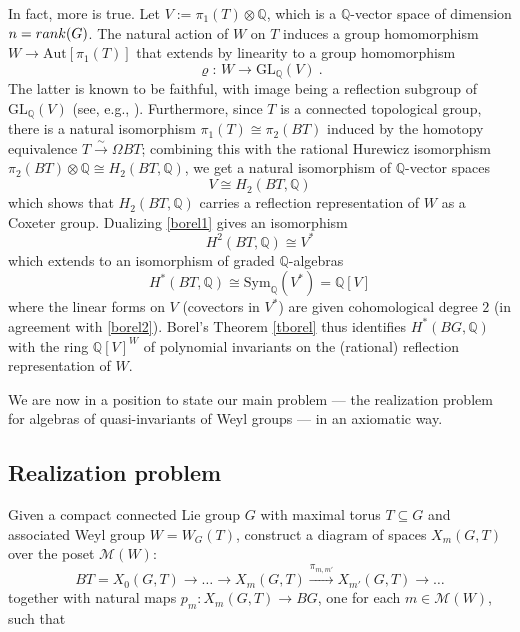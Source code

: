 \documentclass[11pt]{amsart}
\theoremstyle{definition}
\theoremstyle{remark}
\numberwithin{equation}{section}
\newcommand{\la}{\label}
\newcommand{\GL}{\mathrm{GL}}
\def\M{\mathcal{M}}
\def\Q{\mathbb{Q}}
\begin{document}
In fact, more is true. Let $ V := \pi_1(T) \otimes \Q $, which is a $\Q$-vector space of dimension $ n = {\rm rank}(G)$. The natural action of $W$ on $T$ induces a group homomorphism $W \to \mathrm{Aut}[\pi_1(T)]$ that extends by linearity to a group homomorphism
%
\begin{equation} \la{weylglq} \varrho:\, W \to \GL_{\Q}(V) \ .\end{equation}
%
The latter is known to be faithful, with image being a reflection subgroup of $\GL_{\Q}(V)$ (see, e.g., \cite[Theorem 5.16]{DW98}). 
Furthermore, since $T$ is a connected topological group, there is a natural isomorphism $\pi_1(T) \cong \pi_2(BT)$ induced by the homotopy equivalence $T \stackrel{\sim}{\to} \Omega B T$; combining this with the rational Hurewicz isomorphism  $\pi_2(BT) \otimes \Q \cong H_2(BT, \Q)$, we get a natural isomorphism of $\Q$-vector spaces 
%
\begin{equation} \la{borel1} V \cong H_2(BT , \Q)\end{equation}
%
which shows that $H_2(BT, \Q)$ carries a reflection representation of $W$ as a Coxeter group. Dualizing \eqref{borel1} gives an isomorphism 
%
\begin{equation} 
\la{borel2}
H^2(BT, \Q) \cong V^{\ast} 
\end{equation}
%
which extends to an isomorphism of graded $\Q$-algebras 
%
\begin{equation} 
\la{borel3} 
H^{\ast}(BT , \Q) \cong \mathrm{Sym}_{\Q}(V^{\ast}) = \Q[V] 
\end{equation}
%
where the linear forms on $V$ (covectors in $V^{\ast}$) are given cohomological degree $2$ (in agreement with \eqref{borel2}). Borel's Theorem \ref{tborel} thus identifies $H^{\ast}(BG , \Q)$ with the ring $\Q[V]^W$ of polynomial invariants on the (rational) reflection representation of $W$. 

We are now in a position to state our main problem --- the realization problem for algebras of quasi-invariants of Weyl groups --- in an axiomatic way.

\subsection{Realization problem} 
\la{realizationprob}
Given a compact connected Lie group $G$ with maximal torus $T \subseteq G$ and associated Weyl group $ W = W_G(T)$, construct a diagram of spaces $X_m(G,T)$ over the poset  $\M(W)$:
%
\begin{equation} 
\la{realize}
BT=X_0(G,T) \to \ldots \to X_m(G,T) \xrightarrow{\pi_{m,m'}} X_{m'}(G,T) \to \ldots 
\end{equation}
%
together with natural maps $p_m: X_m(G,T) \to BG$, one for each $m \in \M(W) $, such that
\end{document}
